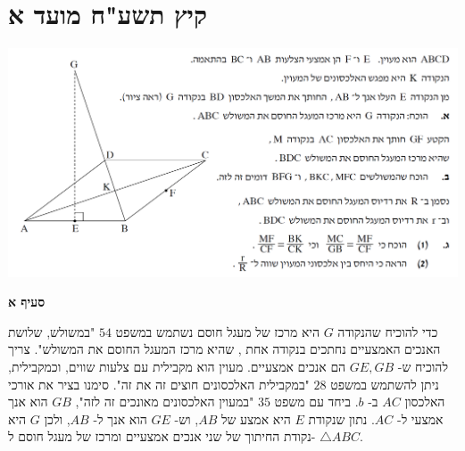 \documentclass[12pt,a4paper]{article}
\begin{document}

\newpage

\section{קיץ תשע"ח מועד א}

\begin{center}
\includegraphics[width=\textwidth]{summer-2018a-4}
\end{center}
\vspace{-8mm}
\textbf{סעיף א}

כדי להוכיח שהנקודה
$G$
היא מרכז של מעגל חוסם נשתמש במשפט
$54$
"במשולש, שלושת האנכים האמצעיים נחתכים בנקודה אחת , שהיא מרכז המעגל החוסם את המשולש". צריך להוכיח ש-%
$GE,GB$
הם אנכים אמצעיים. מעוין הוא מקבילית עם צלעות שווים, וכמקבילית, ניתן להשתמש במשפט 
$28$
"במקבילית האלכסונים חוצים זה את זה". סימנו בציר את אורכי האלכסון
$AC$
ב-%
$b$.
ביחד עם משפט
$35$
"במעוין האלכסונים מאונכים זה לזה", 
$GB$
הוא אנך אמצעי ל-%
$AC$.
נתון שנקודת
$E$
היא אמצע של 
$AB$,
וש-%
$GE$
הוא אנך ל-%
%
$AB$,
ולכן
$G$
היא נקודת החיתוך של שני אנכים אמצעיים ומרכז של מעגל חוסם ל-%
$\triangle ABC$.
\end{document}

